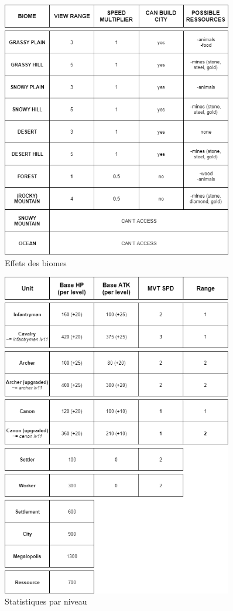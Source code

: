\documentclass[12pt]{report}
\begin{document}
\begin{figure}[H]
    \centering
    \includegraphics[width=0.9\textwidth]{DIAG_BIOMES__effects}
    \caption{Effets des biomes}
\end{figure}
\begin{figure}[H]
    \centering
    \includegraphics[width=0.9\textwidth]{DIAG_TROOPS__stats}
    \caption{Statistiques par niveau}
\end{figure}
\end{document}
